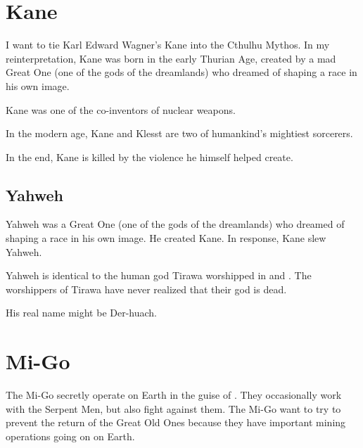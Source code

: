 \documentclass[a4paper,12pt,openany,oneside]{book}
\begin{document}
\section{Kane}
I want to tie Karl Edward Wagner's Kane into the Cthulhu Mythos. 
In my reinterpretation, Kane was born in the early Thurian Age, created by a mad Great One (one of the gods of the dreamlands) who dreamed of shaping a race in his own image. 

Kane was one of the co-inventors of nuclear weapons. 

In the modern age, Kane and Klesst are two of humankind's mightiest sorcerers. 

In the end, Kane is killed by the violence he himself helped create. 







\subsection{Yahweh}
Yahweh was a Great One (one of the gods of the dreamlands) who dreamed of shaping a race in his own image. 
He created Kane. 
In response, Kane slew Yahweh.

Yahweh is identical to the human god Tirawa worshipped in \cite{HPLovecraft:TheCurseofYig} and \cite{HPLovecraft:TheMound}. 
The worshippers of Tirawa have never realized that their god is dead. 

His real name might be Der-huach.















\section{Mi-Go}
The Mi-Go secretly operate on Earth in the guise of . 
They occasionally work with the Serpent Men, but also fight against them.
The Mi-Go want to try to prevent the return of the Great Old Ones because they have important mining operations going on on Earth.
\end{document}

